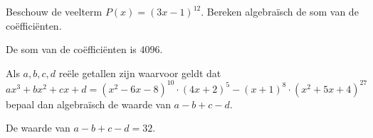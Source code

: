 \documentclass{ximera}
\begin{document}
\begin{exercise}
Beschouw de veelterm $P(x) = (3x - 1)^{12}$. Bereken algebraïsch de som van de coëfficiënten. 
\begin{oplossing} De som van de coëfficiënten is $4096$. \end{oplossing}
\end{exercise}

\begin{exercise}
Als $a,b,c,d$ reële getallen zijn waarvoor geldt dat
\[
ax^3 + bx^2 + cx + d = (x^2-6x-8)^{10}\cdot(4x+2)^5 - (x+1)^8\cdot(x^2+5x+4)^{27}
\]
bepaal dan algebraïsch de waarde van $a-b+c-d$.
\begin{oplossing} De waarde van \(a-b+c-d = 32\).\end{oplossing}
\end{exercise}
\end{document}

